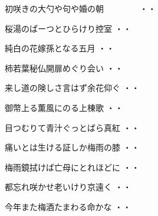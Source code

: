 \begin{shiika}初咲きの大勺や句や婚の朝　　　　
\hfill{・・}\end{shiika}
\vspace{0.4cm}
\begin{shiika}桜湯のぱーつとひらけり控室
\hfill{・・}\end{shiika}
\vspace{0.4cm}
\begin{shiika}純白の花嫁孫となる五月
\hfill{・・}\end{shiika}
\vspace{0.4cm}
\begin{shiika}柿若葉秘仏開扉めぐり会い
\hfill{・・}\end{shiika}
\vspace{0.4cm}
\begin{shiika}来し道の険しさ言はず余花仰ぐ
\hfill{・・}\end{shiika}
\vspace{0.4cm}
\begin{shiika}御幣上る薫風にのる上棟歌
\hfill{・・}\end{shiika}
\vspace{0.4cm}
\begin{shiika}目つむりて青汁ぐっとばら真紅
\hfill{・・}\end{shiika}
\vspace{0.4cm}
\begin{shiika}痛いとは生ける証しか梅雨の膝
\hfill{・・}\end{shiika}
\vspace{0.4cm}
\begin{shiika}梅雨鏡拭けば亡母にとれほどに
\hfill{・・}\end{shiika}
\vspace{0.4cm}
\begin{shiika}都忘れ咲かせ老いけり京遠く
\hfill{・・}\end{shiika}
\vspace{0.4cm}
\begin{shiika}今年また梅酒たまわる命かな
\hfill{・・}\end{shiika}
\vspace{0.4cm}
